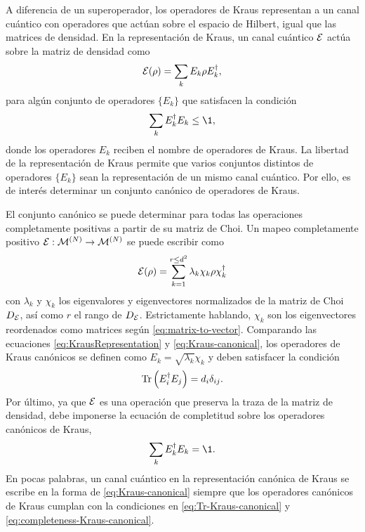 A diferencia de un superoperador, los operadores de Kraus representan
a un canal cuántico con operadores que actúan sobre el espacio 
de Hilbert, igual que las matrices de densidad. En la representación 
de Kraus, un canal cuántico $\mathcal{E}$ actúa sobre la matriz 
de densidad como
\begin{align}\label{eq:KrausRepresentation}
\mathcal{E}\qty(\rho)=\sum_k E_k\rho E_k^{\dagger},
\end{align}
para algún conjunto de operadores $\{E_k\}$ que satisfacen la 
condición~\cite{nielsen_chuang_2011}
\begin{align}
\sum _kE_k^{\dagger}E_k\leq\1,
\end{align} 
donde los operadores $E_k$ reciben el nombre de operadores de Kraus.
La libertad de la representación de Kraus permite que 
varios conjuntos distintos de operadores $\{E_k\}$ sean la representación
de un mismo canal cuántico. Por ello, es de interés
determinar un conjunto canónico de operadores de Kraus.

El conjunto canónico se puede determinar para todas las operaciones 
completamente positivas a partir de su matriz de Choi. Un mapeo 
completamente positivo $\mathcal{E}:\mathcal{M}^{(N)}\to\mathcal{M}^{(N)}$ 
se puede escribir como~\citep{bengtsson_zyczkowski_2017}
\begin{align}
\mathcal{E}(\rho) = 
\sum_{k=1}^{r\leq d^2}\lambda_k\chi_k\rho\chi_k^{\dagger}
\label{eq:Kraus-canonical}
\end{align}
con $\lambda_k$ y $\chi_k$ los eigenvalores y eigenvectores 
normalizados de la matriz de Choi $D_{\mathcal{E}}$, así como $r$ el rango 
de $D_{\mathcal{E}}$. 
Estrictamente hablando, $\chi_k$ son los eigenvectores reordenados 
como matrices según \eqref{eq:matrix-to-vector}.
Comparando las ecuaciones \eqref{eq:KrausRepresentation} y
\eqref{eq:Kraus-canonical}, los operadores de Kraus canónicos 
se definen como $E_k=\sqrt{\lambda_k}\chi_k$ y deben satisfacer
la condición
\begin{align}
  \Tr\qty(E_i^{\dagger}E_j)=d_i\delta_{ij}.
  \label{eq:Tr-Kraus-canonical}
\end{align}
Por último, ya que $\mathcal{E}$ es una operación que preserva la traza de 
la matriz de densidad, debe imponerse la ecuación de completitud 
sobre los operadores canónicos de Kraus,
\begin{align}
  \sum_kE_k^{\dagger}E_k=\1.
  \label{eq:completeness-Kraus-canonical}
\end{align}
 
En pocas palabras, un canal cuántico en la representación canónica de 
Kraus se escribe en la forma de \eqref{eq:Kraus-canonical}
siempre que los operadores canónicos de Kraus cumplan con 
la condiciones en \eqref{eq:Tr-Kraus-canonical} y 
\eqref{eq:completeness-Kraus-canonical}. 

